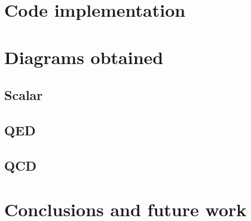 \documentclass[11pt,a4paper,twoside,pdf]{article}
\numberwithin{equation}{section}
\begin{document}
\section{Code implementation}

\section{Diagrams obtained}

\subsection{Scalar}

\subsection{QED}

\subsection{QCD}

\section{Conclusions and future work}




\nocite{QFT}
\nocite{QCDG}
\end{document}
